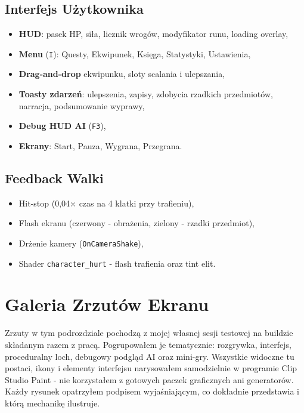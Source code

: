\subsection{Interfejs Użytkownika}
\begin{itemize}
    \item \textbf{HUD}: pasek HP, siła, licznik wrogów, modyfikator runu, loading overlay,
    \item \textbf{Menu} (\texttt{I}): Questy, Ekwipunek, Księga, Statystyki, Ustawienia,
    \item \textbf{Drag-and-drop} ekwipunku, sloty scalania i ulepszania,
    \item \textbf{Toasty zdarzeń}: ulepszenia, zapisy, zdobycia rzadkich przedmiotów, narracja, podsumowanie wyprawy,
    \item \textbf{Debug HUD AI} (\texttt{F3}),
    \item \textbf{Ekrany}: Start, Pauza, Wygrana, Przegrana.
\end{itemize}

\subsection{Feedback Walki}
\begin{itemize}
    \item Hit-stop (0{,}04$\times$ czas na 4 klatki przy trafieniu),
    \item Flash ekranu (czerwony - obrażenia, zielony - rzadki przedmiot),
    \item Drżenie kamery (\texttt{OnCameraShake}),
    \item Shader \texttt{character\_hurt} - flash trafienia oraz tint elit.
\end{itemize}

\section{Galeria Zrzutów Ekranu}

Zrzuty w tym podrozdziale pochodzą z mojej własnej sesji testowej na buildzie składanym razem z pracą. Pogrupowałem je tematycznie: rozgrywka, interfejs, proceduralny loch, debugowy podgląd AI oraz mini-gry. Wszystkie widoczne tu postaci, ikony i elementy interfejsu narysowałem samodzielnie w programie Clip Studio Paint - nie korzystałem z gotowych paczek graficznych ani generatorów. Każdy rysunek opatrzyłem podpisem wyjaśniającym, co dokładnie przedstawia i którą mechanikę ilustruje.

